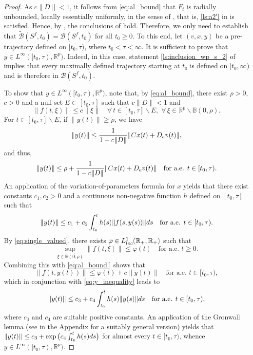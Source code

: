 \documentclass[10pt,a4paper]{amsart}
\newcommand{\B}{\mathbb B}
\newcommand{\R}{\mathbb R}
\newcommand{\sB}{{\mathcal B}}
\begin{document}
\begin{proof}
As $c\|D\|<1$, it follows from \eqref{eq:al_bound} that $F_t$ is radially unbounded, locally essentially uniformly, in the sense of , that is, \ref{ls:a2'} in 
is satisfied. Hence, by  , the conclusions of  hold. Therefore, we only need to establish that  $\tilde\sB(S^f,t_0)=\sB(S^f,t_0)$ for all $t_0\geq 0$. To this end, let $(v,x,y)$ be a pre-trajectory defined on $[t_0,\tau)$, where $t_0<\tau<\infty$. It is sufficient to prove that $y\in L^\infty([t_0,\tau),\R^p)$. Indeed, in this case,
statement \ref{ls:inclusion_wp_s_2} of  implies that every maximally defined trajectory starting at $t_0$ is defined on $[t_0,\infty)$ and is therefore in $\sB(S^f,t_0)$.

To show that $y\in L^\infty([t_0,\tau),\R^p)$, note that, by \eqref{eq:al_bound}, there exist $\rho>0$, $c>0$ and a null set $E\subset[t_0,\tau]$
such that $c\|D\|<1$ and
\begin{equation}\label{eq:al_bound'}
\|f(t,\xi)\|\leq c\|\xi\|\quad\forall\,t\in [t_0,\tau]\backslash E,\,\,\forall\,\xi\in\R^p\backslash\B(0,\rho).
\end{equation}
For $t\in [t_0,\tau]\backslash E$, if $\|y(t)\|\geq\rho$, we have
\[
\|y(t)\|\leq\frac{1}{1-c\|D\|}\|Cx(t)+D_{\rm e}v(t)\|,
\]
and thus,
\[
\|y(t)\|\leq\rho+\frac{1}{1-c\|D\|}\|Cx(t)+D_{\rm e}v(t)\|\quad\mbox{for a.e. $t\in[t_0,\tau)$.}
\]
An application of the variation-of-parameters formula for $x$ yields that there
exist constants $c_1,c_2>0$ and a continuous non-negative function $h$ defined
on $[t_0,\tau]$ such that
\begin{equation}\label{eq:y_inequality}
\|y(t)\|\leq c_1+c_2\int_{t_0}^th(s)\|f(s,y(s))\|{\rm d}s\quad\mbox{for a.e. $t\in[t_0,\tau)$.}
\end{equation}
By \eqref{eq:single_valued}, there exists $\varphi\in L^1_{\rm loc}(\R_+,\R_+)$ such that
\[
\sup_{\xi\in\overline{\B(0,\rho)}}\|f(t,\xi)\|\leq\varphi(t)\quad\mbox{for a.e. $t\geq 0$}.
\]
Combining this with \eqref{eq:al_bound'} shows that
\[
\|f(t,y(t))\|\leq\varphi(t)+c\|y(t)\|\quad\mbox{for a.e. $t\in[t_0,\tau)$},
\]
which in conjunction with \eqref{eq:y_inequality} leads to
\[
\|y(t)\|\leq c_3+c_4\int_{t_0}^th(s)\|y(s)\|{\rm d}s\quad\mbox{for a.e. $t\in[t_0,\tau)$,}
\]
where $c_3$ and $c_4$ are suitable positive constants. An application of the Gronwall lemma (see  in the Appendix for a suitably general version) yields that $\|y(t)\|\leq c_3+\exp\big(c_4\int_{t_0}^t h(s){\rm d}s\big)$ for almost every $t\in [t_0,\tau)$, whence
$y\in L^\infty([t_0,\tau),\R^p)$.
\end{proof}
\end{document}
